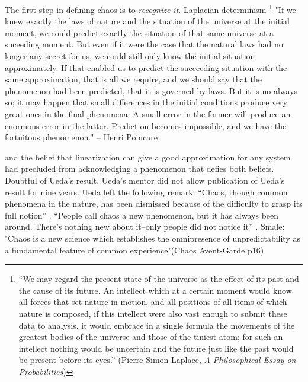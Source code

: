 \documentclass[10pt,twoside,draft]{book}
\begin{document}
The first step in defining chaos is to \textit{recognize it}.
Laplacian determinism 
\footnote{``We may regard the present state of the universe as the effect of its past and the cause of its future. An intellect which at a certain moment would know all forces that set nature in motion, and all positions of all items of which nature is composed, if this intellect were also vast enough to submit these data to analysis, it would embrace in a single formula the movements of the greatest bodies of the universe and those of the tiniest atom; for such an intellect nothing would be uncertain and the future just like the past would be present before its eyes.''
  (Pierre Simon Laplace, \textit{A Philosophical Essay on Probabilities})}
"If we knew exactly the laws of nature and the situation of the universe at the
initial moment, we could predict exactly the situation of that same universe
at a suceeding moment. But even if it were the case that the natural laws
had no longer any secret for us, we could still only know the initial situation
approximately. If that enabled us to predict the succeeding situation with
the same approximation, that is all we require, and we should say that the
phenomenon had been predicted, that it is governed by laws. But it is no
always so; it may happen that small differences in the initial conditions
produce very great ones in the final phenomena. A small error in the former
will produce an enormous error in the latter. Prediction becomes impossible,
and we have the fortuitous phenomenon." -- Henri Poincare

\citep{stone} and the belief that linearization can give a good approximation for any system had precluded from acknowledging a phenomenon that defies both beliefs.
Doubtful of Ueda's result, Ueda's mentor did not allow publication of Ueda's result for nine years.
Ueda left the following remark: ``Chaos, though common phenomena in the nature, has been dismissed because of the difficulty to grasp its full notion'' \citep[p533]{gleick}.
``People call chaos a new phenomenon, but it has always been around.
There's nothing new about it--only people did not notice it''
\citep[p.27]{ueda-abraham}.
Smale: "Chaos is a new science which establishes the omnipresence of unpredictability as a fundamental feature of common experience"(Chaos Avent-Garde p16)
\end{document}
